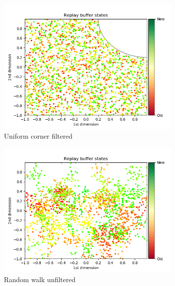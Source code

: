 \documentclass{article}
\begin{document}
\begin{figure}[H]
\begin{subfigure}[b]{0.3\linewidth}
    \includegraphics[width=\linewidth]{Study_2/2.3/visualizations/uniform-corner.png}
    \caption{Uniform corner filtered}
  \end{subfigure}
    \begin{subfigure}[b]{0.3\linewidth}
    \includegraphics[width=\linewidth]{Study_2/visualizations/sequential.png}
    \caption{Random walk unfiltered}
  \end{subfigure}
  \begin{subfigure}[b]{0.3\linewidth}

\end{subfigure}
\end{figure}
\end{document}
